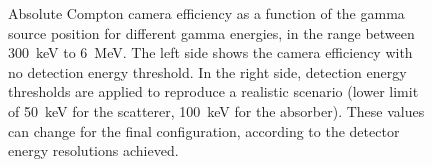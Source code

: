 \begin{figure} [!hbtp]	
\centering
\caption{Absolute Compton camera efficiency as a function of the gamma source position for different gamma energies, in the range between 300~keV to 6~MeV. The left side shows the camera efficiency with no detection energy threshold. In the right side, detection energy thresholds are applied to reproduce a realistic scenario (lower limit of 50~keV for the scatterer, 100~keV for the absorber). These values can change for the final configuration, according to the detector energy resolutions achieved.}
\label{fig::efficiency_study}
\end{figure}

